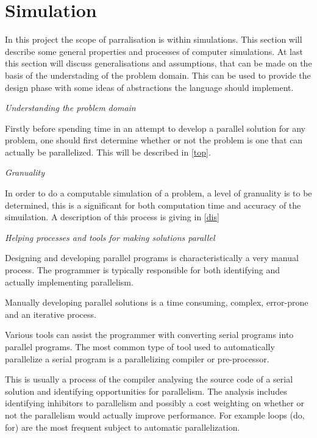 \section{Simulation}

In this project the scope of parralisation is within simulations. This section will describe some general properties and processes of computer simulations. At last this section will discuss generalisations and assumptions, that can be made on the basis of the understading of the problem domain. This can be used to provide the design phase with some ideas of abstractions the language should implement.

\emph{Understanding the problem domain}

Firstly before spending time in an attempt to develop a parallel solution for any problem, one should first determine whether or not the problem is one that can actually be parallelized. This will be described in \cref{top}.

\emph{Granuality}

In order to do a computable simulation of a problem, a level of granuality is to be determined, this is a significant for both computation time and accuracy of the simuilation. A description of this process is giving in \cref{dis}

\emph{Helping processes and tools for making solutions parallel}

Designing and developing parallel programs is characteristically a very manual process. The programmer is typically responsible for both identifying and actually implementing parallelism.

Manually developing parallel solutions is a time consuming, complex, error-prone and an iterative process.

Various tools can assist the programmer with converting serial programs into parallel programs. The most common type of tool used to automatically parallelize a serial program is a parallelizing compiler or pre-processor.

This is usually a process of the compiler analysing the source code of a serial solution and identifying opportunities for parallelism. The analysis includes identifying inhibitors to parallelism and possibly a cost weighting on whether or not the parallelism would actually improve performance. For example loops (do, for) are the most frequent subject to automatic parallelization.

